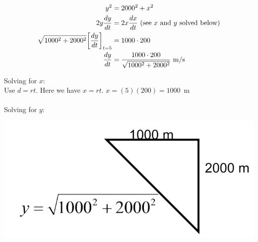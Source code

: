 \documentclass[nooutcomes]{ximera}
\begin{document}
\begin{problem}
\begin{freeResponse}
	\begin{align*}
	y^2&=2000^2+x^2\\
	2y{\frac{dy}{dt}}&=2x{\frac{dx}{dt}}\ \text{(see $x$ and $y$ solved below)}\\
	\sqrt{1000^2+2000^2}\eval{{\frac{dy}{dt}}}_{t=5}&=1000 \cdot 200 \\
	{\frac{dy}{dt}}&=\frac{1000 \cdot 200}{\sqrt{1000^2+2000^2}}\ \text{m/s}
	\end{align*}

Solving for $x$:\\
Use $d=rt$.  Here we have $x=rt$.  $x=(5)(200)=1000$\ m  \\\\

Solving for $y$:
	\begin{image}
	\includegraphics[scale=.5]{Figure3.png}
	\end{image}

\end{freeResponse}
\end{problem}
\end{document}
